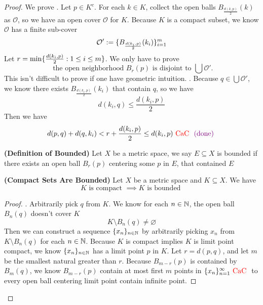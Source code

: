 \documentclass{report}
\begin{document}
\begin{proof}
We prove  . Let $p\in K^c$. For each $k\in K$, collect the open balls $B_{\frac{d(k,p)}{2}}(k)$ as $\mathcal{O}$, so we have an open cover $\mathcal{O}$ for $K$. Because  $K$ is a compact subset, we know $\mathcal{O}$ has a finite sub-cover
\begin{equation}
\mathcal{O}':=\{ B_{\frac{d(k_i,p)}{2}}(k_i) \}_{i=1}^m
\end{equation}
Let $r=\min \{ \frac{d(k_i,p)}{2}:1\leq i\leq m \}$. We only have to prove 
\begin{equation}
  \text{ the open neighborhood $B_r(p)$ is disjoint to $\bigcup \mathcal{O}'$.}
\end{equation}
This isn't difficult to prove if one have geometric intuition.  . Because $q\in \bigcup \mathcal{O}'$, we know there exists $B_{\frac{d(k_i,p)}{2}}(k_i)$ that contain $q$, so we have
 \begin{equation}
d(k_i,q)\leq \frac{d(k_i,p)}{2}
\end{equation}
Then we have
\begin{equation}
d(p,q)+d(q,k_i)< r+\frac{d(k_i,p)}{2}\leq d(k_i,p)\text{ \textcolor{red}{CaC} }\textcolor{violet}{\text{ (done) }}
\end{equation}
\begin{definition}
\textbf{(Definition of Bounded)} Let $X$ be a metric space, we say $E\subseteq X$ is bounded if there exists an open ball $B_r(p)$ centering some $p$ in $E$, that contained $E$
\end{definition}
\begin{theorem}
\textbf{(Compact Sets Are Bounded)} Let $X$ be a metric space and $K\subseteq X$. We have
\begin{equation}
K\text{ is compact }\implies K\text{ is bounded }
\end{equation}
\end{theorem}
\begin{proof}
. Arbitrarily pick $q$ from  $K$. We know for each $n\in\mathbb{N}$, the open ball $B_n(q)$ doesn't cover $K$  
\begin{equation}
K\setminus B_n(q)\neq \varnothing
\end{equation}
Then we can construct a sequence $\{ x_n \}_{n\in\mathbb{N}}$ by arbitrarily picking $x_n$ from $K\setminus B_n(q)$ for each $n\in\mathbb{N}$. Because  $K$ is compact implies $K$ is limit point compact, we know $\{ x_n \}_{n\in\mathbb{N}}$ has a limit point  $p$ in  $K$. Let $r=d(p,q)$, and let $m$ be the smallest natural greater than  $r$. Because $B_{m-r}(p)$ is contained by $B_m(q)$, we know $B_{m-r}(p)$ contain at most first $m$ points in  $\{ x_n \}_{n=1}^\infty\text{ \textcolor{red}{CaC} }$ to every open ball centering limit point contain infinite point.
\end{proof}
\fbox{\begin{minipage}{39em}

\end{minipage}}

\end{proof}
\end{document}
